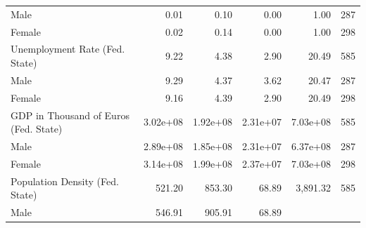 \documentclass[a4paper, oneside, hyperfootnotes = false]{article}
\begin{document}
{\begin{table}[ht]
\begin{center}
{\begin{tabular}{llllll}
			\multicolumn{1}{l}{\hspace{1em}Male} &
			\multicolumn{1}{r}{0.01} &
			\multicolumn{1}{r}{0.10} &
			\multicolumn{1}{r}{0.00} &
			\multicolumn{1}{r}{1.00} &
			\multicolumn{1}{r}{287} \\
			\multicolumn{1}{l}{\hspace{1em}Female} &
			\multicolumn{1}{r}{0.02} &
			\multicolumn{1}{r}{0.14} &
			\multicolumn{1}{r}{0.00} &
			\multicolumn{1}{r}{1.00} &
			\multicolumn{1}{r}{298} \\
			\multicolumn{1}{l}{Unemployment Rate (Fed. State)} &
			\multicolumn{1}{r}{9.22} &
			\multicolumn{1}{r}{4.38} &
			\multicolumn{1}{r}{2.90} &
			\multicolumn{1}{r}{20.49} &
			\multicolumn{1}{r}{585} \\
			\multicolumn{1}{l}{\hspace{1em}Male} &
			\multicolumn{1}{r}{9.29} &
			\multicolumn{1}{r}{4.37} &
			\multicolumn{1}{r}{3.62} &
			\multicolumn{1}{r}{20.47} &
			\multicolumn{1}{r}{287} \\
			\multicolumn{1}{l}{\hspace{1em}Female} &
			\multicolumn{1}{r}{9.16} &
			\multicolumn{1}{r}{4.39} &
			\multicolumn{1}{r}{2.90} &
			\multicolumn{1}{r}{20.49} &
			\multicolumn{1}{r}{298} \\
			\multicolumn{1}{l}{GDP in Thousand of Euros (Fed. State)} &
			\multicolumn{1}{r}{3.02e+08} &
			\multicolumn{1}{r}{1.92e+08  } &
			\multicolumn{1}{r}{2.31e+07} &
			\multicolumn{1}{r}{7.03e+08} &
			\multicolumn{1}{r}{585} \\
			\multicolumn{1}{l}{\hspace{1em}Male} &
			\multicolumn{1}{r}{2.89e+08} &
			\multicolumn{1}{r}{1.85e+08} &
			\multicolumn{1}{r}{2.31e+07} &
			\multicolumn{1}{r}{6.37e+08} &
			\multicolumn{1}{r}{287} \\
			\multicolumn{1}{l}{\hspace{1em}Female} &
			\multicolumn{1}{r}{3.14e+08} &
			\multicolumn{1}{r}{1.99e+08} &
			\multicolumn{1}{r}{2.37e+07} &
			\multicolumn{1}{r}{7.03e+08  } &
			\multicolumn{1}{r}{298} \\
			\multicolumn{1}{l}{Population Density (Fed. State)} &
			\multicolumn{1}{r}{521.20} &
			\multicolumn{1}{r}{853.30} &
			\multicolumn{1}{r}{68.89} &
			\multicolumn{1}{r}{3,891.32} &
			\multicolumn{1}{r}{585} \\
			\multicolumn{1}{l}{\hspace{1em}Male} &
			\multicolumn{1}{r}{546.91} &
			\multicolumn{1}{r}{905.91} &
			\multicolumn{1}{r}{68.89} &

\end{tabular}}
\end{center}
\end{table}}
\end{document}
